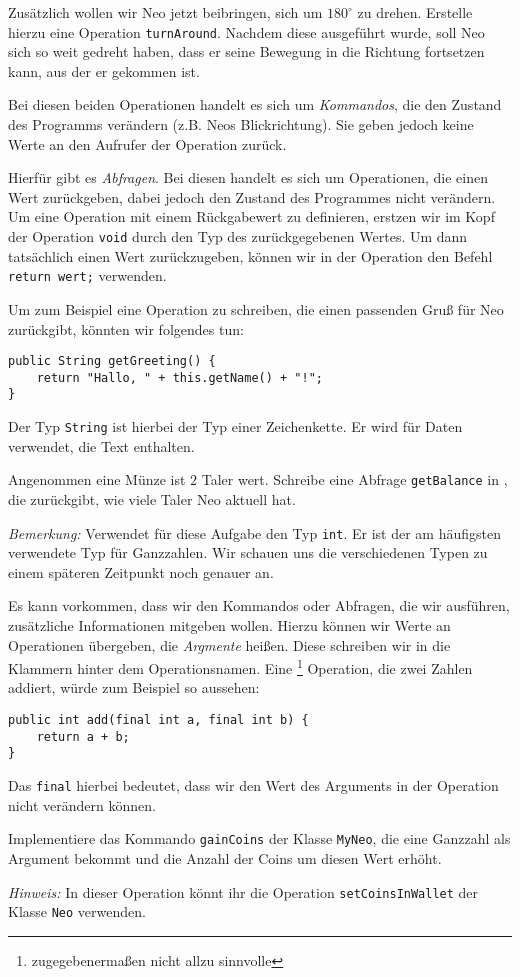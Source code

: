     \subexcercise
    Zusätzlich wollen wir Neo jetzt beibringen, sich um \(180^\circ\) zu drehen.
    Erstelle hierzu eine Operation \lstinline{turnAround}.
    Nachdem diese ausgeführt wurde, soll Neo sich so weit gedreht haben, dass er seine Bewegung in die Richtung fortsetzen kann, aus der er gekommen ist.


    Bei diesen beiden Operationen handelt es sich um \emph{Kommandos}, die den Zustand des Programms verändern (z.B. Neos Blickrichtung). Sie geben jedoch keine Werte an den Aufrufer der Operation zurück.

    Hierfür gibt es \emph{Abfragen}. Bei diesen handelt es sich um Operationen, die einen Wert zurückgeben, dabei jedoch den Zustand des Programmes nicht verändern. Um eine Operation mit einem Rückgabewert zu definieren, erstzen wir im Kopf der Operation \lstinline{void} durch den Typ des zurückgegebenen Wertes. Um dann tatsächlich einen Wert zurückzugeben, können wir in der Operation den Befehl \lstinline{return wert;} verwenden.

    Um zum Beispiel eine Operation zu schreiben, die einen passenden Gruß für Neo zurückgibt, könnten wir folgendes tun:
    \begin{lstlisting}
public String getGreeting() {
    return "Hallo, " + this.getName() + "!";
}
    \end{lstlisting}
    Der Typ \lstinline{String} ist hierbei der Typ einer Zeichenkette. Er wird für Daten verwendet, die Text enthalten.

    \excercise Angenommen eine Münze ist \(2\) Taler wert. Schreibe eine Abfrage
    \lstinline{getBalance} in \ownclass{}, die  zurückgibt, wie viele Taler Neo aktuell hat.

    \emph{Bemerkung:} Verwendet für diese Aufgabe den Typ \lstinline{int}. Er ist der am häufigsten verwendete Typ für Ganzzahlen. Wir schauen uns die verschiedenen Typen zu einem späteren Zeitpunkt noch genauer an.

        Es kann vorkommen, dass wir den Kommandos oder Abfragen, die wir ausführen, zusätzliche Informationen mitgeben wollen. Hierzu können wir Werte an Operationen übergeben, die \emph{Argmente} heißen. Diese schreiben wir in die Klammern hinter dem Operationsnamen. Eine \footnote{zugegebenermaßen nicht allzu sinnvolle} Operation, die zwei Zahlen addiert, würde zum Beispiel so aussehen:
    \begin{lstlisting}
public int add(final int a, final int b) {
    return a + b;
}
    \end{lstlisting}
    Das \lstinline{final} hierbei bedeutet, dass wir den Wert des Arguments in der Operation nicht verändern können.

    \excercise Implementiere das Kommando \lstinline{gainCoins} der Klasse \lstinline{MyNeo}, die eine Ganzzahl als Argument bekommt und die Anzahl der Coins um diesen Wert erhöht.

    \emph{Hinweis:} In dieser Operation könnt ihr die Operation \lstinline{setCoinsInWallet} der Klasse \lstinline{Neo} verwenden.\par
